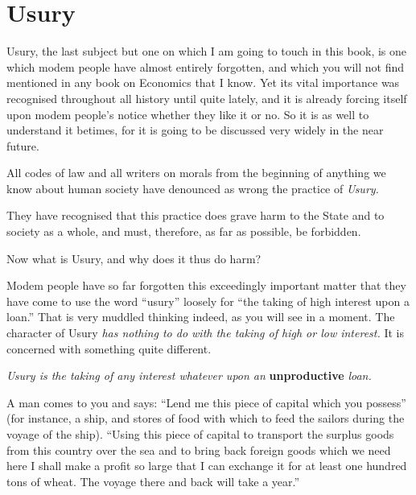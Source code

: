 \documentclass{book}
\begin{document}
\chapter*{Usury}
\label{chapter-20}
Usury, the last subject but one on which I am going to touch in this book, is one which modem people have almost entirely forgotten, and which you will not find mentioned in any book on Economics that I know. Yet its vital importance was recognised throughout all history until quite lately, and it is already forcing itself upon modem people’s notice whether they like it or no. So it is as well to understand it betimes, for it is going to be discussed very widely in the near future.

All codes of law and all writers on morals from the beginning of anything we know about human society have denounced as wrong the practice of \emph{Usury.}

They have recognised that this practice does grave harm to the State and to society as a whole, and must, therefore, as far as possible, be forbidden.

Now what is Usury, and why does it thus do harm?

Modem people have so far forgotten this exceedingly important matter that they have come to use the word “usury” loosely for “the taking of high interest upon a loan.” That is very muddled thinking indeed, as you will see in a moment. The character of Usury \emph{has nothing to do with the taking of high or low interest.} It is concerned with something quite different.

\emph{Usury is the taking of any interest whatever upon an} \textbf{unproductive} \emph{loan.}

A man comes to you and says: “Lend me this piece of capital which you possess” (for instance, a ship, and stores of food with which to feed the sailors during the voyage of the ship). “Using this piece of capital to transport the surplus goods from this country over the sea and to bring back foreign goods which we need here I shall make a profit so large that I can exchange it for at least one hundred tons of wheat. The voyage there and back will take a year.”
\end{document}
